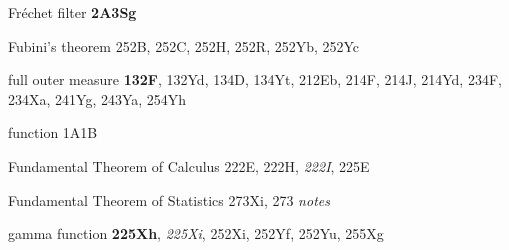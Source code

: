 Fr\'echet filter {\bf 2A3Sg}





































Fubini's theorem 252B, 252C, 252H, 252R, 252Yb, 252Yc








full outer measure {\bf 132F}, 132Yd, 134D, 134Yt,
  212Eb, 214F, 214J, 214Yd, 234F, 234Xa, 241Yg, 243Ya, 254Yh














function 1A1B



Fundamental Theorem of Calculus 222E, 222H, {\it 222I}, 225E


Fundamental Theorem of Statistics 273Xi, 273 {\it notes}



\indexmedskip
















gamma function {\bf 225Xh}, {\it 225Xi}, 252Xi, 252Yf, 252Yu,
255Xg










